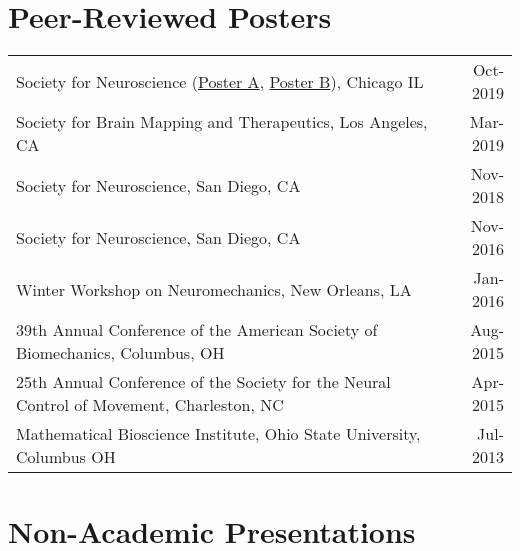 \documentclass[10pt,a4paper]{article}
\begin{document}
\vspace*{2mm}\section*{Peer-Reviewed Posters}

  \vspace*{1mm}\noindent\begin{tabularx}{17cm}{X r}
    Society for Neuroscience (\href{https://github.com/bc/resume/blob/master/conferences/sfn2019_a.pdf}{Poster A}, \href{https://github.com/bc/resume/blob/master/conferences/sfn2019_b.pdf}{Poster B}), Chicago IL & Oct-2019 \\ %
    Society for Brain Mapping and Therapeutics, Los Angeles, CA & Mar-2019 \\ %
    Society for Neuroscience, San Diego, CA & Nov-2018 \\ %
    Society for Neuroscience, San Diego, CA& Nov-2016 \\ 
    Winter Workshop on Neuromechanics, New Orleans, LA & Jan-2016 \\ %
    39th Annual Conference of the American Society of Biomechanics, Columbus, OH & Aug-2015 \\
    25th Annual Conference of the Society for the Neural Control of Movement, Charleston, NC & Apr-2015 \\
    Mathematical Bioscience Institute, Ohio State University, Columbus OH & Jul-2013\\
  \end{tabularx}


  \vspace*{2mm}\section*{Non-Academic Presentations}
\end{document}
